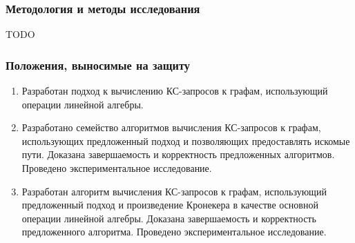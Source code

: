 \subsubsection*{\large{Методология и методы исследования}}
TODO



\subsubsection*{\large{Положения, выносимые на защиту}}
\begin{enumerate}
	\item Разработан подход к вычислению КС-запросов к графам, использующий операции линейной алгебры.
	\item Разработано семейство алгоритмов вычисления КС-запросов к графам, использующих предложенный подход и позволяющих предоставлять искомые пути. Доказана завершаемость и корректность предложенных алгоритмов. Проведено экспериментальное исследование.
	\item Разработан алгоритм вычисления КС-запросов к графам, использующий предложенный подход и произведение Кронекера в качестве основной операции линейной алгебры. Доказана завершаемость и корректность предложенного алгоритма. Проведено экспериментальное исследование.
\end{enumerate}


